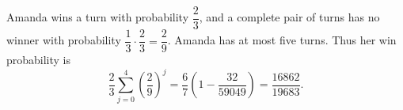 Amanda wins a turn with probability $\dfrac{2}{3}$, and a complete pair of turns has no winner with probability $\dfrac{1}{3}\cdot\dfrac{2}{3}=\dfrac{2}{9}$. Amanda has at most five turns. Thus her win probability is \[\dfrac{2}{3}\sum_{j=0}^4\left(\dfrac{2}{9}\right)^j=\dfrac{6}{7}\left(1-\dfrac{32}{59049}\right)=\boxed{\dfrac{16862}{19683}}.\]
